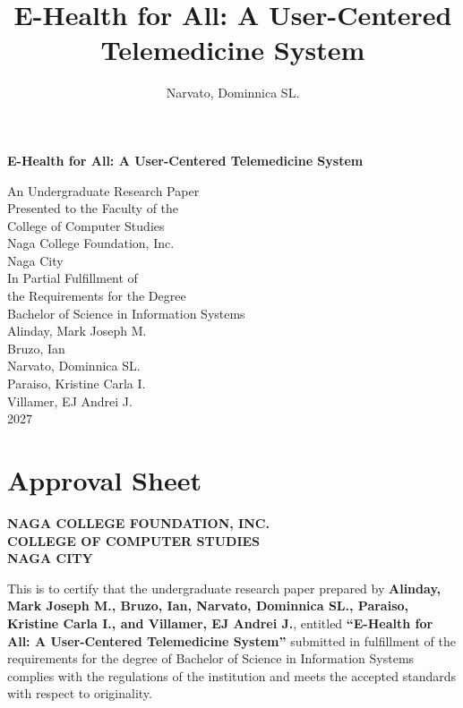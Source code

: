 \documentclass[12pt]{report}
\title{E-Health for All: A User-Centered Telemedicine System}
\author{Narvato, Dominnica SL.}
\renewcommand{\headrulewidth}{0pt}
\begin{document}
\fancypagestyle{plain}{%
  \fancyhf{}
  \fancyfoot[R]{\thepage}
  \renewcommand{\headrulewidth}{0pt}
}

\thispagestyle{empty}
\begin{center}
  \vspace*{1in}
  {\fontsize{14}{18}\bfseries E-Health for All: A User-Centered Telemedicine System\par}
  \vspace{1.5in}
  An Undergraduate Research Paper\\[6pt]
  Presented to the Faculty of the\\[6pt]
  College of Computer Studies\\[6pt]
  Naga College Foundation, Inc.\\[6pt]
  Naga City\\
  \vspace{1in}
  In Partial Fulfillment of\\[6pt]
  the Requirements for the Degree\\[6pt]
  Bachelor of Science in Information Systems\\
  \vspace{1in}
  Alinday, Mark Joseph M.\\[4pt]
  Bruzo, Ian\\[4pt]
  Narvato, Dominnica SL.\\[4pt]
  Paraiso, Kristine Carla I.\\[4pt]
  Villamer, EJ Andrei J.\\
  \vspace{1.5in}
  2027
\end{center}
\clearpage

\chapter*{\centering Approval Sheet}
\begin{center}
  {\bfseries NAGA COLLEGE FOUNDATION, INC.}\\[0.4em]
  {\bfseries COLLEGE OF COMPUTER STUDIES}\\[0.4em]
  {\bfseries NAGA CITY}\\[1.5em]
\end{center}

\noindent
This is to certify that the undergraduate research paper prepared by
\textbf{Alinday, Mark Joseph M., Bruzo, Ian, Narvato, Dominnica SL.,
Paraiso, Kristine Carla I., and Villamer, EJ Andrei J.}, entitled
\textbf{``E-Health for All: A User-Centered Telemedicine System''} submitted
in fulfillment of the requirements for the degree of Bachelor of Science in
Information Systems complies with the regulations of the institution and meets
the accepted standards with respect to originality.
\end{document}
